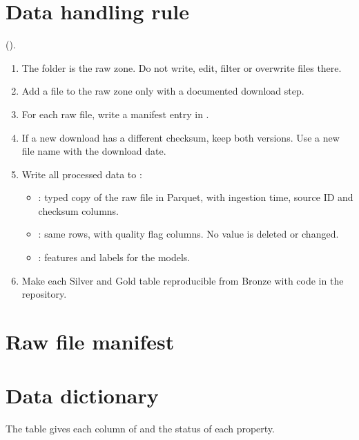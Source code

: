 \documentclass[11pt]{article}
\begin{document}
\section{Data handling rule}
\sWorking{} ().
\begin{enumerate}
  \item The folder  is the raw zone. Do not write, edit, filter or overwrite files there.
  \item Add a file to the raw zone only with a documented download step.
  \item For each raw file, write a manifest entry in .
  \item If a new download has a different checksum, keep both versions. Use a new file name with the download date.
  \item Write all processed data to :
  \begin{itemize}
    \item {}: typed copy of the raw file in Parquet, with ingestion time, source ID and checksum columns.
    \item {}: same rows, with quality flag columns. No value is deleted or changed.
    \item {}: features and labels for the models.
  \end{itemize}
  \item Make each Silver and Gold table reproducible from Bronze with code in the repository.
\end{enumerate}

\section{Raw file manifest}
\manifestentries

\section{Data dictionary}
The table gives each column of  and the status of each property.
\end{document}
